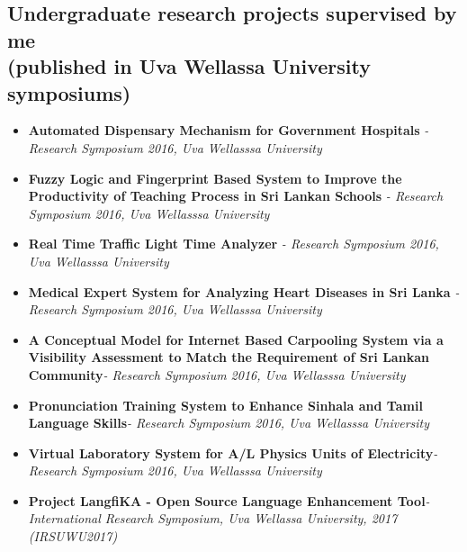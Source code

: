 \documentclass[11pt,a4paper,scan]{moderncv}        %
\begin{document}
\subsection{Undergraduate research projects supervised by me \\ (published in Uva Wellassa University symposiums)}
\begin{itemize}
	
	\item {\textbf{Automated Dispensary Mechanism for Government Hospitals}\textit{ - Research Symposium 2016, Uva Wellasssa University}}
	\vspace{6pt}
	
	\item {\textbf{Fuzzy Logic and Fingerprint Based System  to Improve the Productivity of Teaching Process in Sri Lankan Schools} \textit{ - Research Symposium 2016, Uva Wellasssa University}}
	\vspace{6pt}
	
	\item {\textbf{Real Time Traffic Light Time Analyzer} \textit{- Research Symposium 2016, Uva Wellasssa University}}
	\vspace{6pt}
	
	\item {\textbf{Medical Expert System for Analyzing Heart Diseases in Sri Lanka} \textit{- Research Symposium 2016, Uva Wellasssa University}}
	\vspace{6pt}
	
	\item {\textbf{A Conceptual Model for Internet Based Carpooling System via a Visibility Assessment to Match the Requirement of Sri Lankan Community}\textit{- Research Symposium 2016, Uva Wellasssa University}}
	\vspace{6pt}
	

	
	\item {\textbf{Pronunciation Training System to Enhance Sinhala and Tamil Language Skills}\textit{- Research Symposium 2016, Uva Wellasssa University}}
	\vspace{6pt}
	
	\item {\textbf{Virtual Laboratory System for A/L Physics Units of Electricity}\textit{- Research Symposium 2016, Uva Wellasssa University}}
	\vspace{6pt}
	\item {\textbf{Project LangfiKA - Open Source Language Enhancement Tool}\textit{- International Research Symposium, Uva Wellassa University, 2017 (IRSUWU2017)}}
	\vspace{6pt}
		

\end{itemize}
\end{document}
